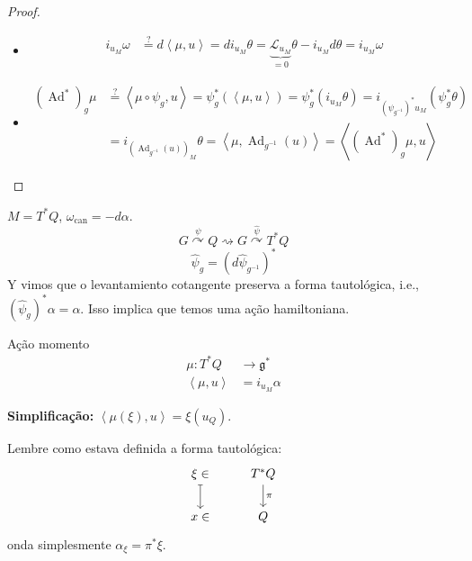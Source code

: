 \begin{proof}\leavevmode
	\begin{itemize}
	\item 
		 \begin{align*}
			i_{u_M}\omega&\overset{?}{=} d \left<\mu,u\right> =di_{u_M}\theta=\underbrace{\mathcal{L}_{u_{M}}}_{=0}\theta-i_{u_{M}}d\theta=i_{u_{M}}\omega
		\end{align*}
	\item 
		\begin{align*}
			(\operatorname{Ad}^*)_g\mu&\overset{?}{=}\left<\mu\circ \psi_g,u\right> =\psi^* _g(\left<\mu,u\right> )=\psi^* _g(i_{u_M}\theta)=i_{(\psi_{g^{-1}})^*u_M}(\psi_g^*\theta)\\
			&=i_{(\operatorname{Ad}_{g^{-1}}(u))_M}\theta=\left<\mu,\operatorname{Ad}_{g^{-1}}(u)\right> =\left<(\operatorname{Ad}^*)_g\mu,u\right> 
		\end{align*}
	\end{itemize}
\end{proof}

\begin{example}\leavevmode
	$M=T^*Q$, $\omega_{\operatorname{can}}=-d\alpha$.
	\[G\overset{\psi}{\curvearrowright}Q\rightsquigarrow G\overset{\hat{\psi}}{\curvearrowright}T^*Q\]
	\[\hat{\psi}_g=(d\hat{\psi}_{g^{-1}})^*\]
	Y vimos que o levantamiento cotangente preserva a forma tautológica, i.e., $(\hat{\psi}_{g})^*\alpha=\alpha$. Isso implica que temos uma ação hamiltoniana.

	\begin{idea5}{Ação momento}\leavevmode
		\begin{align*}
			\mu:T^*Q  &\longrightarrow \mathfrak{g}^* \\
			\left<\mu,u\right>  &=i_{u_M}\alpha 
		\end{align*}
		
		\textbf{Simplificação:}  $\left<\mu(\xi),u\right> =\xi(u_Q)$.

		Lembre como estava definida a forma tautológica:
		\[\begin{tikzcd}
			\xi \in\arrow[d,maps to]& T^*Q\arrow[d,"\pi"]\\
			x\in&Q
		\end{tikzcd}\]
		onda simplesmente $\alpha_\xi=\pi^*\xi$.
		
	\end{idea5}
\end{example}

